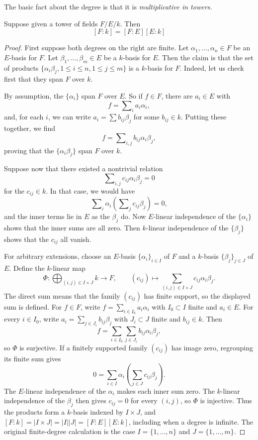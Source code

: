 \medskip\noindent
The basic fact about the degree is that it is {\it multiplicative in towers.}

\begin{lemma}[Multiplicativity]
\label{lemma-multiplicativity-degrees}
Suppose given a tower of fields $F/E/k$. Then
$$
[F:k] = [F:E][E:k]
$$
\end{lemma}

\begin{proof}
First suppose both degrees on the right are finite.
Let $\alpha_1, \ldots, \alpha_n \in F$ be an $E$-basis for $F$. Let
$\beta_1, \ldots, \beta_m \in E$ be a $k$-basis for $E$. Then the claim is
that the set of products
$\{\alpha_i \beta_j, 1 \leq i \leq n, 1 \leq j \leq m\}$
is a $k$-basis for $F$. Indeed, let us check first that they span $F$ over $k$.

\medskip\noindent
By assumption, the $\{\alpha_i\}$ span $F$ over $E$. So if
$f \in F$, there are $a_i \in E$ with
$$
f = \sum\nolimits_i a_i \alpha_i,
$$
and, for each $i$, we can write $a_i = \sum b_{ij} \beta_j$ for some
$b_{ij} \in k$. Putting these together, we find
$$
f = \sum\nolimits_{i,j} b_{ij} \alpha_i \beta_j,
$$
proving that the $\{\alpha_i \beta_j\}$ span $F$ over $k$.

\medskip\noindent
Suppose now that there existed a nontrivial relation
$$
\sum\nolimits_{i,j} c_{ij} \alpha_i \beta_j = 0
$$
for the $c_{ij} \in k$. In that case, we would have
$$
\sum\nolimits_i \alpha_i \left( \sum\nolimits_j c_{ij} \beta_j \right) = 0,
$$
and the inner terms lie in $E$ as the $\beta_j$ do. Now $E$-linear
independence of the $\{\alpha_i\}$ shows that the inner sums are all zero.
Then $k$-linear independence of the $\{\beta_j\}$ shows that the
$c_{ij}$ all vanish.

\medskip\noindent
For arbitrary extensions, choose an $E$-basis
$\{\alpha_i\}_{i \in I}$ of $F$ and a $k$-basis
$\{\beta_j\}_{j \in J}$ of $E$. Define the $k$-linear map
$$
\Phi : \bigoplus_{(i,j) \in I \times J} k \longrightarrow F,
\qquad
(c_{ij}) \longmapsto \sum_{(i,j) \in I \times J} c_{ij}\alpha_i\beta_j.
$$
The direct sum means that the family $(c_{ij})$ has finite support,
so the displayed sum is defined. For $f \in F$, write
$f = \sum_{i \in I_0} a_i\alpha_i$ with $I_0 \subset I$ finite and
$a_i \in E$. For every $i \in I_0$, write
$a_i = \sum_{j \in J_i} b_{ij}\beta_j$ with $J_i \subset J$ finite
and $b_{ij} \in k$. Then
$$
f = \sum_{i \in I_0}\sum_{j \in J_i} b_{ij}\alpha_i\beta_j,
$$
so $\Phi$ is surjective. If a finitely supported family $(c_{ij})$
has image zero, regrouping its finite sum gives
$$
0 = \sum_{i \in I}\alpha_i
\left(\sum_{j \in J} c_{ij}\beta_j\right).
$$
The $E$-linear independence of the $\alpha_i$ makes each inner sum
zero. The $k$-linear independence of the $\beta_j$ then gives
$c_{ij} = 0$ for every $(i,j)$, so $\Phi$ is injective.
Thus the products form a $k$-basis indexed by $I \times J$,
and $[F:k] = |I \times J| = |I||J| = [F:E][E:k]$,
including when a degree is infinite. The original finite-degree
calculation is the case $I = \{1,\ldots,n\}$ and $J = \{1,\ldots,m\}$.
\end{proof}


